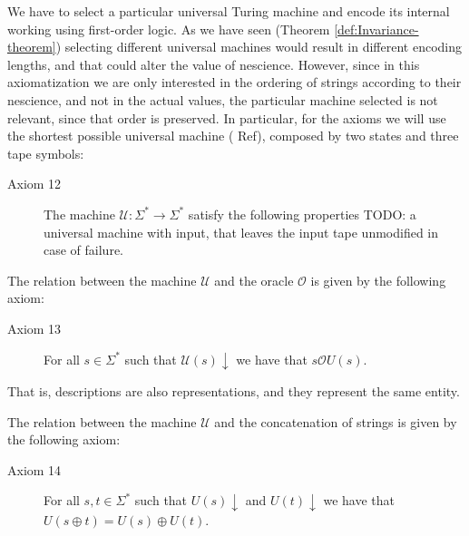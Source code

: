 We have to select a particular universal Turing machine and encode its internal working using first-order logic. As we have seen (Theorem \ref{def:Invariance-theorem}) selecting different universal machines would result in different encoding lengths, and that could alter the value of nescience. However, since in this axiomatization we are only interested in the ordering of strings according to their nescience, and not in the actual values, the particular machine selected is not relevant, since that order is preserved. In particular, for the axioms we will use the shortest possible universal machine ({\color{red} Ref}), composed by two states and three tape symbols:

\vskip 0.25cm

\begin{description}
\item[Axiom 12] The machine $\mathcal{U} : \Sigma^\ast \rightarrow \Sigma^\ast$ satisfy the following properties {\color{red} TODO: a universal machine with input, that leaves the input tape unmodified in case of failure.}
\end{description}

\vskip 0.25cm

The relation between the machine $\mathcal{U}$ and the oracle $\mathcal{O}$ is given by the following axiom:

\vskip 0.25cm

\begin{description}
\item[Axiom 13] For all $s \in \Sigma^\ast$ such that $\mathcal{U}(s) \downarrow$ we have that $s \mathcal{O} U(s)$.
\end{description}

\vskip 0.25cm

That is, descriptions are also representations, and they represent the same entity.

\vskip 0.25cm

The relation between the machine $\mathcal{U}$ and the concatenation of strings is given by the following axiom:

\vskip 0.25cm

\begin{description}
\item[Axiom 14] For all $s, t \in \Sigma^\ast$ such that $U(s) \downarrow$ and $U(t) \downarrow$ we have that $U(s \oplus t) = U(s) \oplus U(t)$.
\end{description}

\vskip 0.25cm

